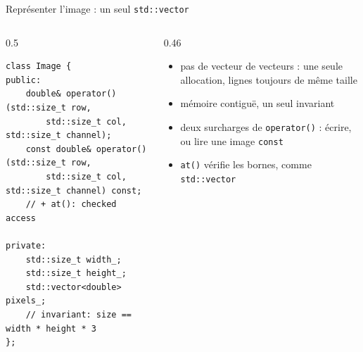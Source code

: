 \documentclass[aspectratio=169,10pt]{beamer}
\newcommand{\code}[1]{\texttt{#1}}
\begin{document}
\begin{frame}[fragile]{Représenter l'image : un seul \code{std::vector}}
  \begin{columns}[T]
    \begin{column}{0.5\textwidth}
\begin{lstlisting}
class Image {
public:
    double& operator()(std::size_t row,
        std::size_t col, std::size_t channel);
    const double& operator()(std::size_t row,
        std::size_t col, std::size_t channel) const;
    // + at(): checked access

private:
    std::size_t width_;
    std::size_t height_;
    std::vector<double> pixels_;
    // invariant: size == width * height * 3
};
\end{lstlisting}
    \end{column}
    \begin{column}{0.46\textwidth}
      \begin{itemize}
        \item pas de vecteur de vecteurs : une seule allocation, lignes toujours de même taille
        \item mémoire contiguë, un seul invariant
        \item deux surcharges de \code{operator()} : écrire, ou lire une image \code{const}
        \item \code{at()} vérifie les bornes, comme \code{std::vector}
      \end{itemize}
    \end{column}
  \end{columns}

  \vspace{0.6em}
  \centering
\end{frame}
\end{document}
